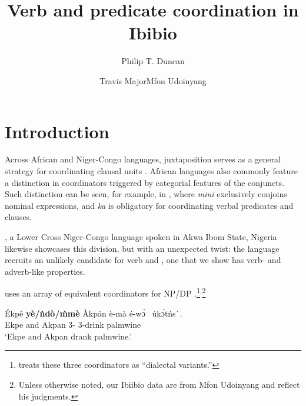 \documentclass[output=paper
,newtxmath
,modfonts
,nonflat]{langsci/langscibook}
\author{Philip T. Duncan\affiliation{University of Kansas}\and Travis Major\affiliation{University of California, Los Angeles}\lastand Mfon Udoinyang\affiliation{University of Kansas}}
\title{Verb and predicate coordination in Ibibio}
\begin{document}
\section{Introduction}\label{sec:duncan-et-al:1} 
Across African and Niger-Congo languages, juxtaposition serves as a general strategy for coordinating clausal units \citep{zeller2015syntax,creissels2000typology,watters2000syntax}. African languages also commonly feature a distinction in coordinators triggered by categorial features of the conjuncts. Such distinction can be seen, for example, in , where \textit{mini} exclusively conjoins nominal expressions, and \textit{ka} is obligatory for coordinating verbal predicates and clauses. 


\noindent {}, a Lower Cross Niger-Congo language spoken in Akwa Ibom State, Nigeria likewise showcases this division, but with an unexpected twist: the language recruits an unlikely candidate for verb and , one that we show has verb- and adverb-like properties. 

 uses an array of equivalent coordinators for NP/DP .\footnote{\citet[147]{essien1990grammar} treats these three coordinators as ``dialectal variants.''}$^,$\footnote{Unless otherwise noted, our Ibiibio data are from Mfon Udoinyang and reflect his judgments.}

\ea\label{ex:duncan-et-al:2}
\gll \'{E}kp\^{e} \textbf{y\`{e}/\`{n}d\`{o}/\`{m}m\`{e}} \`{A}kp\'{a}n \`{e}-m\`{a} \'{e}-\ng w\'ɔ\ng~ \'{u}k\'ɔt\'{n}s\`{\textturnv}\ng. \\
Ekpe and Akpan 3{\pl}-{\pst} 3{\pl}-drink palmwine \\
\glt ‘Ekpe and Akpan drank palmwine.’
\z
\end{document}

